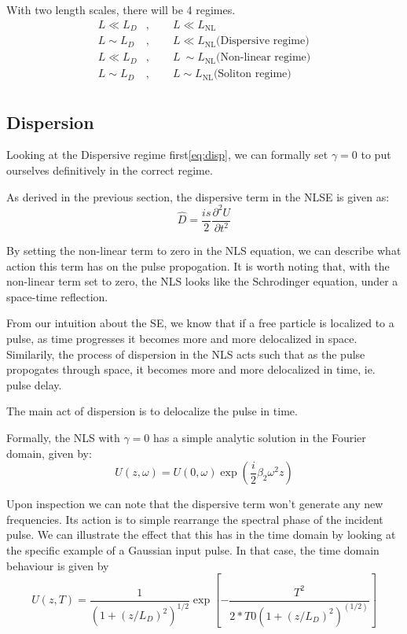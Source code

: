 \documentclass[12pt, titlepage]{article}
\newcommand{\pdd}[2]{\frac{\partial^2 #1}{\partial #2^2}}
\begin{document}
\begin{spacing}{1.1}
With two length scales, there will be 4 regimes. 
\begin{align}
L \ll L_D&,\qquad L \ll L_\text{NL}\\
L \sim L_D&,\qquad L \ll L_\text{NL}\label{eq:disp} \text{(Dispersive regime)}\\
L \ll L_D&,\qquad L ~\sim L_\text{NL}\label{eq:nl} \text{(Non-linear regime)}\\
L \sim L_D&,\qquad L\sim L_\text{NL} \label{eq:solregime}\text{(Soliton regime)}\\
\end{align}
\subsection{Dispersion}

Looking at the Dispersive regime first\eqref{eq:disp}, we can formally set $\gamma = 0$ to put ourselves definitively in the correct regime.

As derived in the previous section, the dispersive term in the NLSE is given as:
\[
\hat{D} = \frac{is}{2}\pdd{U}{t}
\]

By setting the non-linear term to zero in the NLS equation, we can describe what action this term has on the pulse propogation. It is worth noting that, with the non-linear term set to zero, the NLS looks like the Schrodinger equation, under a space-time reflection.

From our intuition about the SE, we know that if a free particle is localized to a pulse, as time progresses it becomes more and more delocalized in space. Similarily, the process of dispersion in the NLS acts such that as the pulse propogates through space, it becomes more and more delocalized in time, ie. pulse delay.

The main act of dispersion is to delocalize the pulse in time.

Formally, the NLS with $\gamma=0$ has a simple analytic solution in the Fourier domain, given by:
\[
U(z,\omega) = U(0,\omega)\exp \left( \frac{i}{2} \beta_2 \omega^2 z\right)
\]

Upon inspection we can note that the dispersive term won't generate any new frequencies. Its action is to simple rearrange the spectral phase of the incident pulse. We can illustrate the effect that this has in the time domain by looking at the specific example of a Gaussian input pulse. In that case, the time domain behaviour is given by~\cite{gorovind}
\[
U(z,T) = \frac{1}{(1 + (z/L_D)^2)^{1/2}} \exp[-\frac{T^2}{2*T0(1+(z/L_D)^2)^(1/2)}]
\]



\end{spacing}
\end{document}
